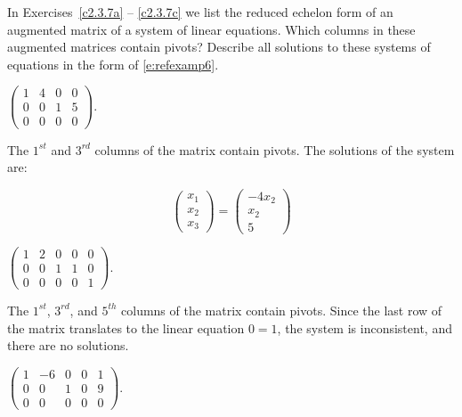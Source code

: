 \documentclass{ximera}
\begin{document}
\noindent In Exercises~\ref{c2.3.7a} -- \ref{c2.3.7c} we list
the reduced echelon form of an augmented matrix of a system of
linear equations.  Which columns in these augmented matrices
contain pivots?  Describe all solutions to these systems of
equations in the form of \eqref{e:refexamp6}.

\begin{exercise} \label{c2.3.7a}
$\left(\begin{array}{rrr|r}
 1  &  4 & 0 & 0\\
 0  &  0 & 1 & 5\\
 0  &  0 & 0 & 0
       \end{array}\right)$.

\begin{solution}
The $1^{st}$ and $3^{rd}$ columns of the matrix contain
pivots.  The solutions of the system are:

\[
\left(\begin{array}{r} x_1 \\ x_2 \\ x_3\end{array} \right)
= \left(\begin{array}{c} -4x_2 \\ x_2 \\ 5\end{array} \right)
\]

\end{solution}
\end{exercise}

\begin{exercise} \label{c2.3.7b}
$\left(\begin{array}{rrrr|r}
 1  &  2 & 0 & 0 & 0\\
 0  &  0 & 1 & 1 & 0\\
 0  &  0 & 0 & 0 & 1
       \end{array}\right)$.

\begin{solution}
The $1^{st}$, $3^{rd}$, and $5^{th}$ columns of the matrix
contain pivots.  Since the last row of the matrix translates to the linear
equation $0 = 1$, the system is inconsistent, and there are no solutions.

\end{solution}
\end{exercise}

\begin{exercise} \label{c2.3.7c}
$\left(\begin{array}{rrrr|r}
 1  & -6 & 0 & 0 & 1\\
 0  &  0 & 1 & 0 & 9 \\
 0  &  0 & 0 & 0 & 0
       \end{array}\right)$.
   \end{exercise}
   
\end{document}
